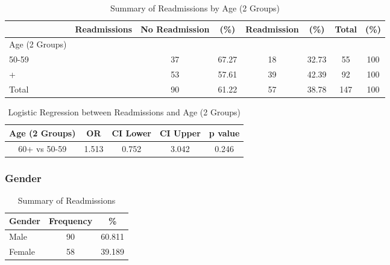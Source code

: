 \documentclass[12pt,]{article}
\begin{document}
\begin{table}[!h]

\caption{\label{tab:unnamed-chunk-4}Summary of Readmissions by Age (2 Groups)}
\centering
\begin{tabular}{>{\centering\arraybackslash}p{5cm}ccccccc}
\toprule
  & Readmissions & No Readmission & (\%) & Readmission & (\%) & Total & (\%)\\
\midrule
Age (2 Groups) &  &  &  &  &  &  & \\
\rowcolor[HTML]{E3E5E7}  50-59 &  & 37 & 67.27 & 18 & 32.73 & 55 & 100\\
60+ &  & 53 & 57.61 & 39 & 42.39 & 92 & 100\\
\rowcolor[HTML]{E3E5E7}  Total &  & 90 & 61.22 & 57 & 38.78 & 147 & 100\\
\bottomrule
\end{tabular}
\end{table}

\begin{table}[!h]

\caption{\label{tab:unnamed-chunk-4}Logistic Regression between Readmissions and Age (2 Groups)}
\centering
\begin{tabular}{ccccc}
\toprule
Age (2 Groups) & OR & CI Lower & CI Upper & p value\\
\midrule
\rowcolor{white}  60+ vs 50-59 & 1.513 & 0.752 & 3.042 & 0.246\\
\bottomrule
\end{tabular}
\end{table}

\pagebreak

\subsubsection{Gender}\label{gender}

\begin{table}[!h]

\caption{\label{tab:unnamed-chunk-5}Summary of Readmissions}
\centering
\begin{tabular}{>{\centering\arraybackslash}p{5cm}cc}
\toprule
Gender & Frequency & \%\\
\midrule
Male & 90 & 60.811\\
\rowcolor[HTML]{E3E5E7}  Female & 58 & 39.189\\
\bottomrule
\end{tabular}
\end{table}
\end{document}
